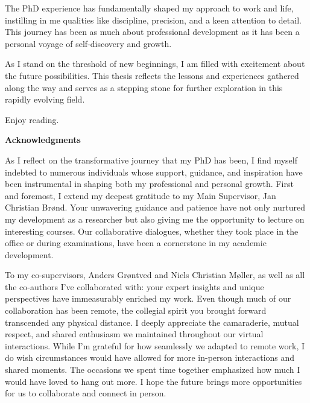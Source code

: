 \documentclass[
  10pt,
]{scrbook}
\let\originaltextbf\textbf
\renewcommand{\textbf}[1]{\textcolor{color1}{\textsf{\originaltextbf{#1}}}}
\begin{document}
The PhD experience has fundamentally shaped my approach to work and life, instilling in me qualities like discipline, precision, and a keen attention to detail. This journey has been as much about professional development as it has been a personal voyage of self-discovery and growth.

As I stand on the threshold of new beginnings, I am filled with excitement about the future possibilities. This thesis reflects the lessons and experiences gathered along the way and serves as a stepping stone for further exploration in this rapidly evolving field.

Enjoy reading.

\newpage

  
\textcolor{color1}{\textsf{\textbf{\Large{Acknowledgments}}}}

\vspace*{\baselineskip}

As I reflect on the transformative journey that my PhD has been, I find myself indebted to numerous individuals whose support, guidance, and inspiration have been instrumental in shaping both my professional and personal growth.
First and foremost, I extend my deepest gratitude to my Main Supervisor, Jan Christian Brønd. Your unwavering guidance and patience have not only nurtured my development as a researcher but also giving me the opportunity to lecture on interesting courses. Our collaborative dialogues, whether they took place in the office or during examinations, have been a cornerstone in my academic development.

To my co-supervisors, Anders Grøntved and Niels Christian Møller, as well as all the co-authors I've collaborated with: your expert insights and unique perspectives have immeasurably enriched my work. Even though much of our collaboration has been remote, the collegial spirit you brought forward transcended any physical distance. I deeply appreciate the camaraderie, mutual respect, and shared enthusiasm we maintained throughout our virtual interactions. While I'm grateful for how seamlessly we adapted to remote work, I do wish circumstances would have allowed for more in-person interactions and shared moments. The occasions we spent time together emphasized how much I would have loved to hang out more. I hope the future brings more opportunities for us to collaborate and connect in person.
\end{document}
